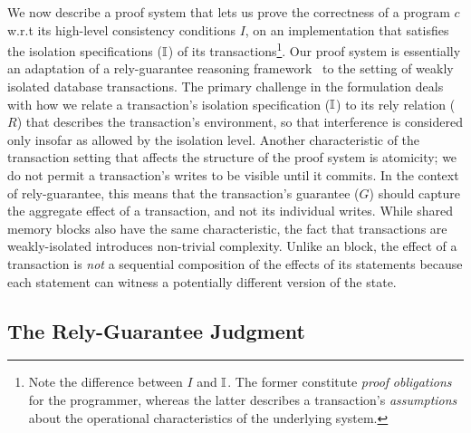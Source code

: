 We now describe a proof system that lets us prove the correctness of a
\txnimp program $c$ w.r.t its high-level consistency conditions $I$,
on an implementation that satisfies the isolation specifications
($\mathbb{I}$) of its transactions\footnote{Note the difference between $I$
  and $\mathbb{I}$. The former constitute \emph{proof} \emph{obligations} for
  the programmer, whereas the latter describes a transaction's
  \emph{assumptions} about the operational characteristics of the
  underlying system.}.  Our proof system is essentially an adaptation
of a rely-guarantee reasoning framework~\cite{rgjones} to the setting
of weakly isolated database transactions.  The primary challenge in
the formulation deals with how we relate a transaction's isolation
specification ($\mathbb{I}$) to its rely relation ($R$) that describes the
transaction's environment, so that interference is considered only
insofar as allowed by the isolation level.  Another characteristic of
the transaction setting that affects the structure of the proof system
is atomicity; we do not permit a transaction's writes to be visible
until it commits.  In the context of rely-guarantee, this means that
the transaction's guarantee ($G$) should capture the aggregate effect
of a transaction, and not its individual writes.  While shared memory
 blocks also have the same characteristic, the fact that
transactions are weakly-isolated introduces non-trivial complexity.
Unlike an  block, the effect of a transaction is \emph{not}
a sequential composition of the effects of its statements because each
statement can witness a potentially different version of the state.

\subsection{The Rely-Guarantee Judgment}
\label{sec:rely-guarantee}



